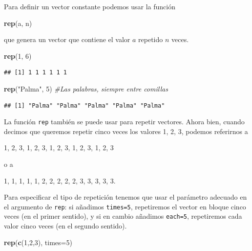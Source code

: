\documentclass[]{book}
\newenvironment{Shaded}{\begin{snugshade}}{\end{snugshade}}
\newcommand{\CommentTok}[1]{\textcolor[rgb]{0.56,0.35,0.01}{\textit{#1}}}
\newcommand{\DataTypeTok}[1]{\textcolor[rgb]{0.13,0.29,0.53}{#1}}
\newcommand{\DecValTok}[1]{\textcolor[rgb]{0.00,0.00,0.81}{#1}}
\newcommand{\KeywordTok}[1]{\textcolor[rgb]{0.13,0.29,0.53}{\textbf{#1}}}
\newcommand{\NormalTok}[1]{#1}
\newcommand{\StringTok}[1]{\textcolor[rgb]{0.31,0.60,0.02}{#1}}
\theoremstyle{definition}
\theoremstyle{definition}
\theoremstyle{definition}
\theoremstyle{remark}
\begin{document}
Para definir un vector constante podemos usar la función

\begin{Shaded}
\begin{Highlighting}[]
\KeywordTok{rep}\NormalTok{(a, n)}
\end{Highlighting}
\end{Shaded}

que genera un vector que contiene el valor \(a\) repetido \(n\) veces.

\begin{Shaded}
\begin{Highlighting}[]
\KeywordTok{rep}\NormalTok{(}\DecValTok{1}\NormalTok{, }\DecValTok{6}\NormalTok{)}
\end{Highlighting}
\end{Shaded}

\begin{verbatim}
## [1] 1 1 1 1 1 1
\end{verbatim}

\begin{Shaded}
\begin{Highlighting}[]
\KeywordTok{rep}\NormalTok{(}\StringTok{"Palma"}\NormalTok{, }\DecValTok{5}\NormalTok{) }\CommentTok{#Las palabras, siempre entre comillas}
\end{Highlighting}
\end{Shaded}

\begin{verbatim}
## [1] "Palma" "Palma" "Palma" "Palma" "Palma"
\end{verbatim}

La función \texttt{rep} también se puede usar para repetir vectores. Ahora bien, cuando decimos que queremos repetir cinco veces los valores 1, 2, 3, podemos referirnos a

1, 2, 3, 1, 2, 3, 1, 2, 3, 1, 2, 3, 1, 2, 3

o a

1, 1, 1, 1, 1, 2, 2, 2, 2, 2, 3, 3, 3, 3, 3.

Para especificar el tipo de repetición tenemos que usar el parámetro adecuado en el argumento de \texttt{rep}: si añadimos \texttt{times=5}, repetiremos el vector en bloque cinco veces (en el primer sentido), y si en cambio añadimos \texttt{each=5}, repetiremos cada valor cinco veces (en el segundo sentido).

\begin{Shaded}
\begin{Highlighting}[]
\KeywordTok{rep}\NormalTok{(}\KeywordTok{c}\NormalTok{(}\DecValTok{1}\NormalTok{,}\DecValTok{2}\NormalTok{,}\DecValTok{3}\NormalTok{), }\DataTypeTok{times=}\DecValTok{5}\NormalTok{)}
\end{Highlighting}
\end{Shaded}
\end{document}
